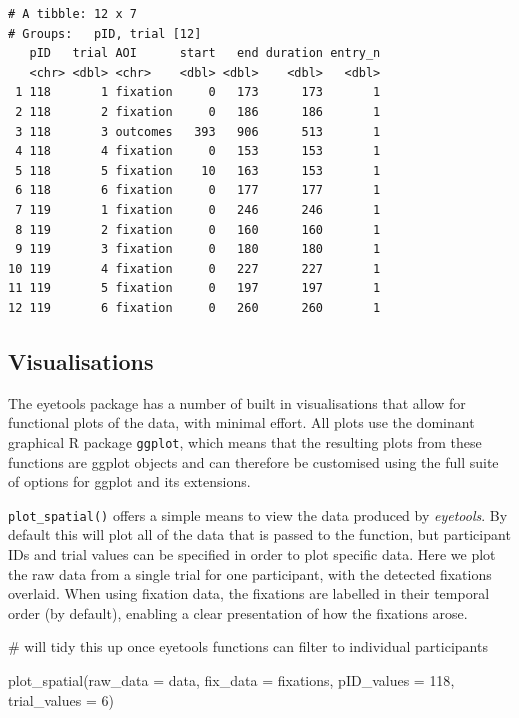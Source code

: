 \documentclass[
  man,
  floatsintext,
  longtable,
  nolmodern,
  notxfonts,
  notimes,
  colorlinks=true,linkcolor=blue,citecolor=blue,urlcolor=blue]{apa7}
\newenvironment{Shaded}{\begin{snugshade}}{\end{snugshade}}
\newcommand{\AttributeTok}[1]{\textcolor[rgb]{0.40,0.45,0.13}{#1}}
\newcommand{\CommentTok}[1]{\textcolor[rgb]{0.37,0.37,0.37}{#1}}
\newcommand{\DecValTok}[1]{\textcolor[rgb]{0.68,0.00,0.00}{#1}}
\newcommand{\FunctionTok}[1]{\textcolor[rgb]{0.28,0.35,0.67}{#1}}
\newcommand{\NormalTok}[1]{\textcolor[rgb]{0.00,0.23,0.31}{#1}}
\begin{document}
\begin{verbatim}
# A tibble: 12 x 7
# Groups:   pID, trial [12]
   pID   trial AOI      start   end duration entry_n
   <chr> <dbl> <chr>    <dbl> <dbl>    <dbl>   <dbl>
 1 118       1 fixation     0   173      173       1
 2 118       2 fixation     0   186      186       1
 3 118       3 outcomes   393   906      513       1
 4 118       4 fixation     0   153      153       1
 5 118       5 fixation    10   163      153       1
 6 118       6 fixation     0   177      177       1
 7 119       1 fixation     0   246      246       1
 8 119       2 fixation     0   160      160       1
 9 119       3 fixation     0   180      180       1
10 119       4 fixation     0   227      227       1
11 119       5 fixation     0   197      197       1
12 119       6 fixation     0   260      260       1
\end{verbatim}

\subsection{Visualisations}\label{visualisations}

The eyetools package has a number of built in visualisations that allow
for functional plots of the data, with minimal effort. All plots use the
dominant graphical R package \texttt{ggplot}, which means that the
resulting plots from these functions are ggplot objects and can
therefore be customised using the full suite of options for ggplot and
its extensions.

\texttt{plot\_spatial()} offers a simple means to view the data produced
by \emph{eyetools}. By default this will plot all of the data that is
passed to the function, but participant IDs and trial values can be
specified in order to plot specific data. Here we plot the raw data from
a single trial for one participant, with the detected fixations
overlaid. When using fixation data, the fixations are labelled in their
temporal order (by default), enabling a clear presentation of how the
fixations arose.

\begin{Shaded}
\begin{Highlighting}[]
\CommentTok{\# will tidy this up once eyetools functions can filter to individual participants}

\FunctionTok{plot\_spatial}\NormalTok{(}\AttributeTok{raw\_data =}\NormalTok{ data,}
             \AttributeTok{fix\_data =}\NormalTok{ fixations,}
             \AttributeTok{pID\_values =} \DecValTok{118}\NormalTok{,}
             \AttributeTok{trial\_values =} \DecValTok{6}\NormalTok{)}
\end{Highlighting}
\end{Shaded}
\end{document}
